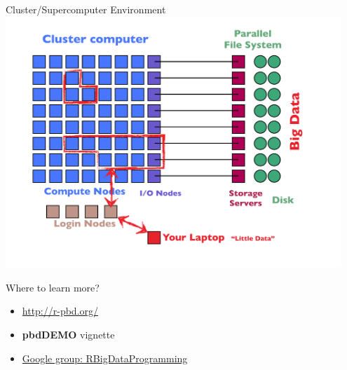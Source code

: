 \begin{frame}{Cluster/Supercomputer Environment}
\includegraphics[width=0.95\textwidth]
{../common/pics/hardware/ParallelHardware22.pdf}
\end{frame}

\begin{frame}
  \begin{block}{Where to learn more?}
  \begin{itemize}
    \item \url{http://r-pbd.org/}
    \item \textbf{pbdDEMO} vignette
    \item \url{Google group: RBigDataProgramming}
  \end{itemize}
  \end{block}
\end{frame}

